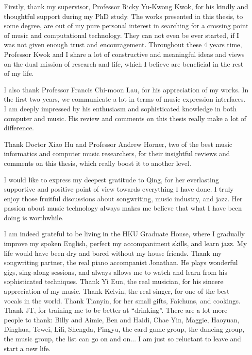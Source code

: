 \begin{acknowledgements}

Firstly, thank my supervisor, Professor Ricky Yu-Kwong Kwok, for his kindly and thoughtful support during my PhD study. The works presented in this thesis, to some degree, are out of my pure personal interest in searching for a crossing point of music and computational technology. They can not even be ever started, if I was not given enough trust and encouragement. Throughout these 4 years time, Professor Kwok and I share a lot of constructive and meaningful ideas and views on the dual mission of research and life, which I believe are beneficial in the rest of my life.

I also thank Professor Francis Chi-moon Lau, for his appreciation of my works. In the first two years, we communicate a lot in terms of music expression interfaces. I am deeply impressed by his enthusiasm and sophisticated knowledge in both computer and music. His review and comments on this thesis really make a lot of difference.

Thank Doctor Xiao Hu and Professor Andrew Horner, two of the best music informatics and computer music researchers, for their insightful reviews and comments on this thesis, which really boost it to another level.

I would like to express my deepest gratitude to Qing, for her everlasting supportive and positive point of view towards everything I have done. I truly enjoy those fruitful discussions about songwriting, music industry, and jazz. Her passion about music technology always makes me believe that what I have been doing is worthwhile.

I am indeed grateful to be living in the HKU Graduate House, where I gradually improve my spoken English, perfect my accompaniment skills, and learn jazz. My life would have been dry and bored without my house friends. Thank my songwriting partner, the real piano accompanist Jonathan. He plays wonderful gigs, sing-along sessions, and always allows me to watch and learn from his sophisticated techniques. Thank Yi Eun, the real musician, for his sincere appreciation of my music. Thank Kelvin, the real singer, for one of the best vocals in the world. Thank Tianyin, for her small gifts, Faichuns, and cookings. Thank JT, for training me to be better at ``drinking''. There are a lot more people to thank: Billy and Aimie, Ben and Haidi, Chae Yin, Maggie, Haoyuan, Dinghua, Tewei, Lili, Shengda, Pingyu, the card game group, the dancing group, the music group, the list can go on and on... I am just so reluctant to leave and start a new life.


\end{acknowledgements}
